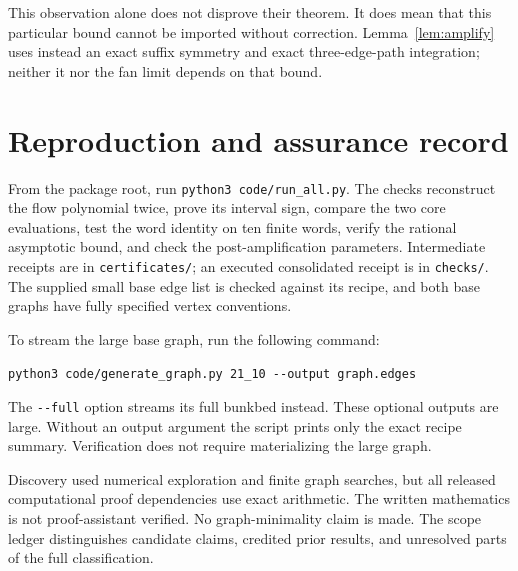 \documentclass[11pt,a4paper]{article}
\theoremstyle{remark}\newtheorem{remark}[theorem]{Remark}
\begin{document}
This observation alone does not disprove their theorem. It does mean that this particular bound cannot be imported without correction. Lemma~\ref{lem:amplify} uses instead an exact suffix symmetry and exact three-edge-path integration; neither it nor the fan limit depends on that bound.

\section{Reproduction and assurance record}
From the package root, run \texttt{python3 code/run\_all.py}. The checks reconstruct the flow polynomial twice, prove its interval sign, compare the two core evaluations, test the word identity on ten finite words, verify the rational asymptotic bound, and check the post-amplification parameters. Intermediate receipts are in \texttt{certificates/}; an executed consolidated receipt is in \texttt{checks/}. The supplied small base edge list is checked against its recipe, and both base graphs have fully specified vertex conventions.

To stream the large base graph, run the following command:\par
\noindent\texttt{python3 code/generate\_graph.py 21\_10 -{}-output graph.edges}\par
The \texttt{-{}-full} option streams its full bunkbed instead. These optional outputs are large. Without an output argument the script prints only the exact recipe summary. Verification does not require materializing the large graph.

Discovery used numerical exploration and finite graph searches, but all released computational proof dependencies use exact arithmetic. The written mathematics is not proof-assistant verified. No graph-minimality claim is made. The scope ledger distinguishes candidate claims, credited prior results, and unresolved parts of the full classification.
\end{document}
